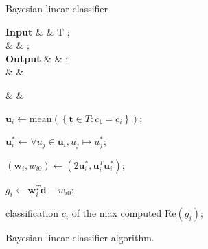 \documentclass[twoside]{IEEEtran}
\begin{document}
\begin{figure}[!t]
    \centering
    \setlength{\intextsep}{0pt}

    \begin{algorithm}[H]
        \caption{Bayesian linear classifier}

        \begin{flalign*}
            \setlength{\arraycolsep}{0pt}
            \begin{matrix*}[l]
                \textbf{Input}  & \text{: } & T ;       \\
                \text{}         &           &  ;        \\
                \textbf{Output} & \text{: } &  ; \\
                \text{}         &           &
            \end{matrix*} &  &
        \end{flalign*}
        \begin{algorithmic}
            \State{}
                \State%
                \( \mathbf{u}_i \gets \mathrm{mean}\left(\left \{ \mathbf{t} \in T : c_\mathbf{t} = c_i \right \} \right) \);

                \State%
                \( \mathbf{u}_i^* \gets \forall u_j \in \mathbf{u}_i, u_j \mapsto u_j^* \);

                \State%
                \( \left(\mathbf{w}_i, w_{i0}\right) \gets \left(2\mathbf{u}_i^*, \mathbf{u}_i^T \mathbf{u}_i^*\right) \);
            \EndFor%

            \State{}
                \State%
                \( g_i \gets \mathbf{w}_i^T \mathbf{d} - w_{i0} \);
            \EndFor%

            \State\Return%
            classification \( c_i \) of the max computed \( \mathrm{Re}\left(g_i\right) \);
        \end{algorithmic}
    \end{algorithm}

    \caption{Bayesian linear classifier algorithm.}%
    \label{bayes}
\end{figure}
\end{document}

